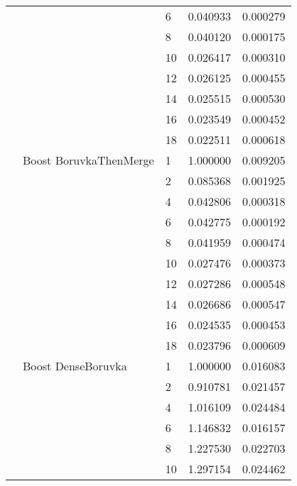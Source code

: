 \begin{tabular}{lllrr}
                      &                     & 6  &  0.040933 &  0.000279 \\
                      &                     & 8  &  0.040120 &  0.000175 \\
                      &                     & 10 &  0.026417 &  0.000310 \\
                      &                     & 12 &  0.026125 &  0.000455 \\
                      &                     & 14 &  0.025515 &  0.000530 \\
                      &                     & 16 &  0.023549 &  0.000452 \\
                      &                     & 18 &  0.022511 &  0.000618 \\
                      & Boost BoruvkaThenMerge & 1  &  1.000000 &  0.009205 \\
                      &                     & 2  &  0.085368 &  0.001925 \\
                      &                     & 4  &  0.042806 &  0.000318 \\
                      &                     & 6  &  0.042775 &  0.000192 \\
                      &                     & 8  &  0.041959 &  0.000474 \\
                      &                     & 10 &  0.027476 &  0.000373 \\
                      &                     & 12 &  0.027286 &  0.000548 \\
                      &                     & 14 &  0.026686 &  0.000547 \\
                      &                     & 16 &  0.024535 &  0.000453 \\
                      &                     & 18 &  0.023796 &  0.000609 \\
                      & Boost DenseBoruvka & 1  &  1.000000 &  0.016083 \\
                      &                     & 2  &  0.910781 &  0.021457 \\
                      &                     & 4  &  1.016109 &  0.024484 \\
                      &                     & 6  &  1.146832 &  0.016157 \\
                      &                     & 8  &  1.227530 &  0.022703 \\
                      &                     & 10 &  1.297154 &  0.024462 \\

\end{tabular}
